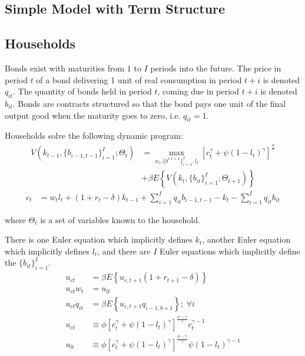 \documentclass[letterpaper,11pt]{article}
\theoremstyle{definition}
\numberwithin{equation}{section}
\begin{document}
\begin{spacing}{1.5}

\section{Simple Model with Term Structure} \label{sec_Model1}

	\subsection{Households}

		Bonds exist with maturities from 1 to $I$ periods into the future.  The price in period $t$ of a bond delivering 1 unit of real consumption in period $t+i$ is denoted $q_{it}$.  The quantity of bonds held in period $t$, coming due in period $t+i$ is denoted $b_{it}$.  Bonds are contracts structured so that the bond pays one unit of the final output good when the maturity goes to zero, i.e. $q_{it} = 1$.

		Households solve the following dynamic program:
		\begin{align}
			V(k_{t-1}, \{b_{i-1,t-1}\}_{i=1}^I; \Theta_t) & = \max_{x_t, \{b^{i,t+1}\}_{i=1}^I, l_t} [c_t^\gamma + \psi(1-l_t)^\gamma]^{\frac{\phi}{\gamma}} \nonumber \\
			& + \beta E \left\{ V(k_t, \{b_{it}\}_{i=1}^I; \Theta_{t+1}) \right\} \nonumber
		\end{align}
		\begin{align}
			c_t & = w_t l_t + (1 + r_t - \delta) k_{t-1} + \sum_{i=1}^I q_{it} b_{i-1,t-1} - k_t - \sum_{i=1}^I  q_{it} b_{it} \label{eq_cdef}
		\end{align}
		
		where $\Theta_t$ is a set of variables known to the household.

		There is one Euler equation which implicitly defines $k_t$, another Euler equation which implicitly defines $l_t$, and there are $I$ Euler equations which implicitly define the $\{b_{it}\}_{i=1}^I$.
		\begin{align}
			u_{ct} & = \beta E\left\{ u_{c,t+1} (1+r_{t+1} - \delta) \right\} \label{eq_kEuler} \\
			u_{ct} w_t & = u_{lt} \label{eq_lEuler} \\
			u_{ct} q_{it} & = \beta E\left\{ u_{c,t+1} q_{i-1,b+1} \right\} \label{eq_bEuler} ; \; \forall i \\
			u_{ct} & \equiv \phi [ c_t^\gamma + \psi(1-l_t)^\gamma]^{\frac{\phi-\gamma}{\gamma}} c_t^{\gamma-1} \nonumber \\
			u_{lt} & \equiv \phi [ c_t^\gamma + \psi(1-l_t)^\gamma]^{\frac{\phi-\gamma}{\gamma}} \psi (1-l_t)^{\gamma - 1} \nonumber
		\end{align}


\end{spacing}
\end{document}

